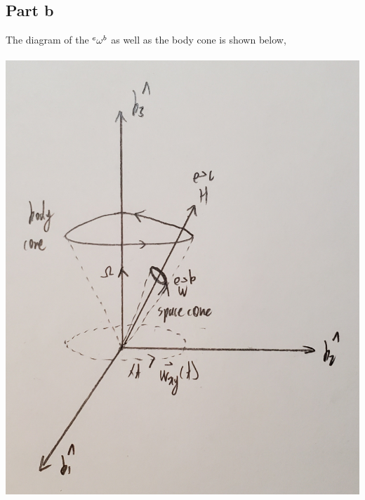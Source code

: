 \documentclass[a4paper, 12pt]{report}
\def\sizes{0.15}
\begin{document}
\begin{center}
\subsection{Part b}
The diagram of the ${}^{e}\omega^{b}$ as well as the body cone is shown below,
\\~\\\includegraphics[scale=\sizes]{Bajingan}

\end{center}
\end{document}
